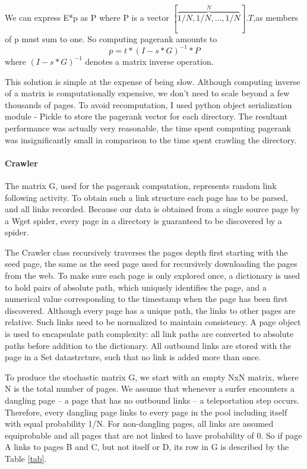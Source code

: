 \documentclass[12pt,twoside,notitlepage]{report}
\begin{document}
We can express E*p as P where P is a vector
\([\overbrace{1/N,1/N,\dots,1/N}^N].T\),as members of p must sum to one.
So computing pagerank amounts to
\begin{equation}
p  = t*(I-s*G)^{-1}*P
\end{equation}
where \((I-s*G)^{-1}\) denotes a matrix inverse operation.

This solution is simple at the expense of being slow. Although computing
inverse of a matrix is computationally expensive, we don't need to scale beyond
a few thousands of pages.  To avoid recomputation, I used python object
serialization module - Pickle to store the pagerank vector for each directory.
The resultant performance was actually very reasonable, the time spent
computing pagerank was insignificantly small in comparison to the time spent
crawling the directory.

\paragraph{Crawler}
The matrix G, used for the pagerank computation, represents random link
following activity. To obtain such a link structure each page has to be parsed,
and all links recorded. Because our data is obtained from a single source page
by a Wget spider, every page in a directory is guaranteed to be discovered by a
spider.

The Crawler class recursively traverses the pages depth first starting with the seed page,
the same as the seed page used for recursively downloading the pages from the
web. To make sure each page is only explored once, a dictionary is used to
hold pairs of absolute path, which uniquely identifies the page, and a
numerical value corresponding to the timestamp when the page has been first
discovered.
Although every page has a unique path, the links to other pages are relative.
Such links need to be normalized to maintain consistency.
A page object is used to encapsulate path complexity: all link paths are
converted to absolute paths before addition to the dictionary.
All outbound links are stored with the page in a Set datastrcture,
such that no link is added more than once. 

To produce the stochastic matrix G, we start with an empty NxN matrix, where N
is the total number of pages. We assume that whenever a surfer encounters a dangling page -- a page that has no
outbound links -- a teleportation step occurs. Therefore, every dangling page
links to every page in the pool including itself with equal probability 1/N. For non-dangling
pages, all links are assumed equiprobable and all pages that are not linked to
have probability of 0. So if page A links to pages B and C, but not itself or
D, its row in G is described by the Table \ref{tab}.
\end{document}
